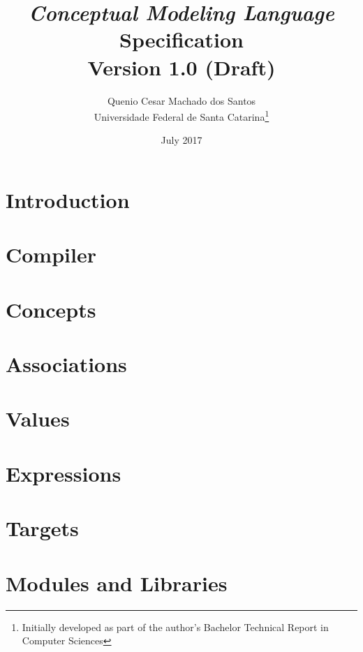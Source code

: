 \documentclass[a4paper,oneside,14pt, extrafontsizes]{memoir}
\title{\emph{Conceptual Modeling Language}\\Specification\\ \small{Version 1.0 (Draft)}}
\author{Quenio Cesar Machado dos Santos\\
\small{Universidade Federal de Santa Catarina}\thanks{
Initially developed as part of the author's Bachelor Technical Report in Computer Sciences}}
\date{July 2017}
\begin{document}
\begin{titlingpage}
\maketitle
\end{titlingpage}

\frontmatter

\begin{KeepFromToc}

\clearpage
\tableofcontents

\clearpage
\listoffigures

\clearpage
\listoftables 

\end{KeepFromToc}

\mainmatter

\chapter{Introduction}


\chapter{Compiler}
\label{ch:compiler}


\chapter{Concepts}


\chapter{Associations}


\chapter{Values}


\chapter{Expressions}

\chapter{Targets}
\label{ch:targets}

\chapter{Modules and Libraries}
\end{document}
